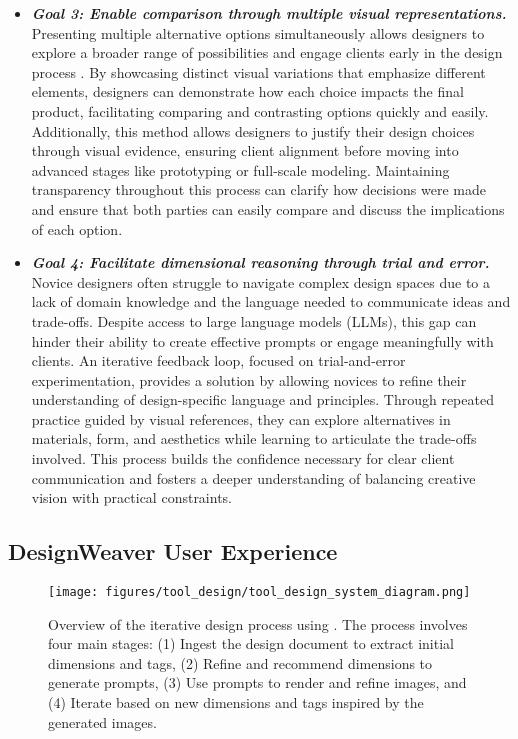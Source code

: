 \begin{itemize}
    \item \textbf{\textit{Goal 3: Enable comparison through multiple visual representations.}} Presenting multiple alternative options simultaneously allows designers to explore a broader range of possibilities and engage clients early in the design process \cite{tohidi2006getting, dow2010parallel}. By showcasing distinct visual variations that emphasize different elements, designers can demonstrate how each choice impacts the final product, facilitating comparing and contrasting options quickly and easily. Additionally, this method allows designers to justify their design choices through visual evidence, ensuring client alignment before moving into advanced stages like prototyping or full-scale modeling. Maintaining transparency throughout this process can clarify how decisions were made and ensure that both parties can easily compare and discuss the implications of each option.
    \item \textbf{\textit{Goal 4: Facilitate dimensional reasoning through trial and error.}} Novice designers often struggle to navigate complex design spaces due to a lack of domain knowledge and the language needed to communicate ideas and trade-offs. Despite access to large language models (LLMs), this gap can hinder their ability to create effective prompts or engage meaningfully with clients. An iterative feedback loop, focused on trial-and-error experimentation, provides a solution by allowing novices to refine their understanding of design-specific language and principles. Through repeated practice guided by visual references, they can explore alternatives in materials, form, and aesthetics while learning to articulate the trade-offs involved. This process builds the confidence necessary for clear client communication and fosters a deeper understanding of balancing creative vision with practical constraints. 
\end{itemize}

\subsection{DesignWeaver User Experience}

\begin{figure*}[htbp]
    \centering
    \texttt{[image: figures/tool\_design/tool\_design\_system\_diagram.png]}
    \caption{Overview of the iterative design process using \toolname{}. The process involves four main stages: (1) Ingest the design document to extract initial dimensions and tags, (2) Refine and recommend dimensions to generate prompts, (3) Use prompts to render and refine images, and (4) Iterate based on new dimensions and tags inspired by the generated images.}
    \label{fig:design_workflow}
\end{figure*}

